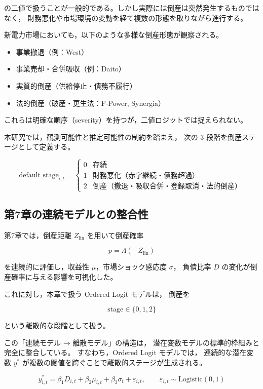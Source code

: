 の二値で扱うことが一般的である。しかし実際には倒産は突然発生するものではなく，
財務悪化や市場環境の変動を経て複数の形態を取りながら進行する。

新電力市場においても，以下のような多様な倒産形態が観察される。

\begin{itemize}
    \item 事業撤退（例：West）
    \item 事業売却・合併吸収（例：Daito）
    \item 実質的倒産（供給停止・債務不履行）
    \item 法的倒産（破産・更生法：F-Power, Synergia）
\end{itemize}

これらは明確な順序（severity）を持つが，二値ロジットでは捉えられない。

本研究では，観測可能性と推定可能性の制約を踏まえ，
次の 3 段階を倒産ステージとして定義する。



\[
\text{default\_stage}_{i,t} =
\begin{cases}
0 & \text{存続} \\
1 & \text{財務悪化（赤字継続・債務超過）} \\
2 & \text{倒産（撤退・吸収合併・登録取消・法的倒産）}
\end{cases}
\]



\subsection*{第7章の連続モデルとの整合性}

第7章では，倒産距離 $Z_{\text{lin}}$ を用いて倒産確率


\[
p = \Lambda(-Z_{\text{lin}})
\]


を連続的に評価し，収益性 $\mu$，市場ショック感応度 $\sigma$，
負債比率 $D$ の変化が倒産確率に与える影響を可視化した。

これに対し，本章で扱う Ordered Logit モデルは，
倒産を


\[
\text{stage} \in \{0,1,2\}
\]


という離散的な段階として扱う。

この「連続モデル → 離散モデル」の構造は，
潜在変数モデルの標準的枠組みと完全に整合している。
すなわち，Ordered Logit モデルでは，
連続的な潜在変数 $y^*$ が複数の閾値を跨ぐことで離散的ステージが生成される。



\[
y^*_{i,t} =
\beta_1 D_{i,t}
+ \beta_2 \mu_{i,t}
+ \beta_3 \sigma_t
+ \varepsilon_{i,t},
\qquad
\varepsilon_{i,t} \sim \text{Logistic}(0,1)
\]





